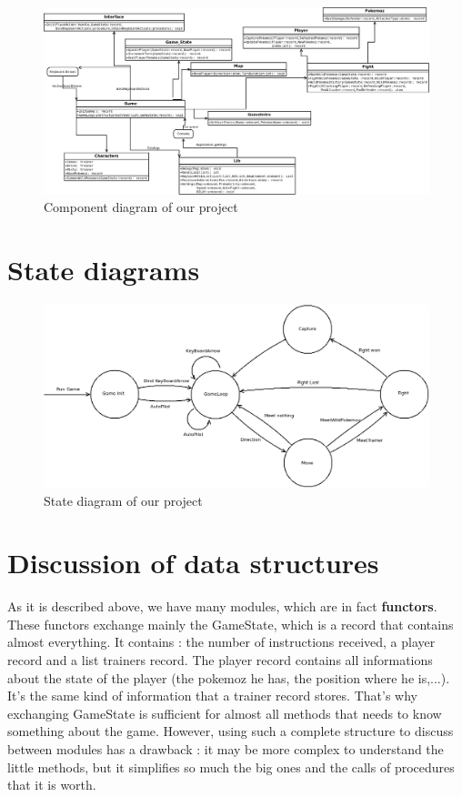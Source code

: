 \documentclass[12pt, a4paper]{article}
\begin{document}
\begin{landscape}

\begin{figure}

\includegraphics[width=\linewidth]{Diagramme1.png}
\caption{Component diagram of our project}
\end{figure}

\end{landscape}


\section{State diagrams}

\begin{figure}
 \includegraphics[width=\linewidth]{State_diagram_oz.png}
 \caption{State diagram of our project}
\end{figure}


\section{Discussion of data structures}

As it is described above, we have many \og{}modules\fg{}, which are in fact \textbf{functors}. These functors exchange mainly the GameState, which is a record that contains almost everything. It contains : the number of instructions received, a player record and a list trainers record. The player record contains all informations about the state of the player (the pokemoz he has, the position where he is,...). It's the same kind of information that a trainer record stores. That's why exchanging GameState is sufficient for almost all methods that needs to know something about the game. However, using such a complete structure to discuss between modules has a drawback : it may be more complex to understand the \og{}little methods\fg{}, but it simplifies so much the big ones and the calls of procedures that it is worth.
\end{document}
